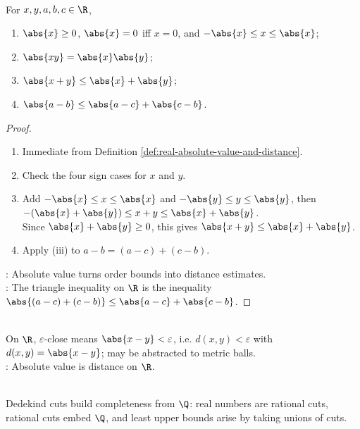 \begin{proposition} \label{prop:real-absolute-value-triangle-inequality} \\
For $x,y,a,b,c\in\R$,
\begin{enumerate}[label=(\roman*)]
\setlength{\itemsep}{0pt}
\item $\abs{x}\geq0$, $\abs{x}=0$ iff $x=0$, and $-\abs{x}\leq x\leq\abs{x}$;
\item $\abs{xy}=\abs{x}\abs{y}$;
\item $\abs{x+y}\leq\abs{x}+\abs{y}$;
\item $\abs{a-b}\leq\abs{a-c}+\abs{c-b}$.
\end{enumerate}
\begin{proof}
\begin{enumerate}[label=(\roman*)]
\setlength{\itemsep}{0pt}
\item Immediate from Definition \ref{def:real-absolute-value-and-distance}.
\item Check the four sign cases for $x$ and $y$.
\item Add $-\abs{x}\leq x\leq\abs{x}$ and $-\abs{y}\leq y\leq\abs{y}$, then $-(\abs{x}+\abs{y})\leq x+y\leq\abs{x}+\abs{y}$.\\
Since $\abs{x}+\abs{y}\geq0$, this gives $\abs{x+y}\leq\abs{x}+\abs{y}$.
\item Apply (iii) to $a-b=(a-c)+(c-b)$.
\end{enumerate}
: Absolute value turns order bounds into distance estimates.\\
: The triangle inequality on $\R$ is the inequality $\abs{(a-c)+(c-b)}\leq\abs{a-c}+\abs{c-b}$.
\end{proof}
\end{proposition}

\begin{perspective} \label{per:epsilon-closeness-to-metric-language} \\
On $\R$, $\varepsilon$-close means $\abs{x-y}<\varepsilon$, i.e. $d(x,y)<\varepsilon$ with $d(x,y)=\abs{x-y}$; may be abstracted to metric balls.\\
: Absolute value is distance on $\R$.
\end{perspective}

\begin{perspective} \label{per:dedekind-construction-as-completeness-proof} \\
Dedekind cuts build completeness from $\Q$: real numbers are rational cuts, rational cuts embed $\Q$, and least upper bounds arise by taking unions of cuts.
\end{perspective}

